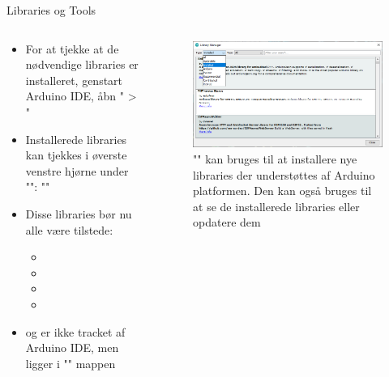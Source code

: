 \documentclass[aspectratio=169]{beamer}
\begin{document}
\begin{frame}{Libraries og Tools}
\begin{columns}
	\begin{column}{0.5\textwidth}
		\begin{textBox}
			\begin{itemize}
				\item For at tjekke at de nødvendige libraries er installeret, genstart Arduino IDE, åbn " > "
				\item Installerede libraries kan tjekkes i øverste venstre hjørne under "": ""
				\item Disse libraries bør nu alle være tilstede:
				\begin{itemize}
					\item {}
					\item {}
					\item {}
					\item {}
				\end{itemize}
				\item {} og  er ikke tracket af Arduino IDE, men ligger i "" mappen
			\end{itemize}
		\end{textBox}
	\end{column}
	\begin{column}{0.5\textwidth}
		\begin{figure}
  			\includegraphics[width=\textwidth]{assets/pictures/librarymanager-installed.png}
  			\caption{"" kan bruges til at installere nye libraries der understøttes af Arduino platformen. Den kan også bruges til at se de installerede libraries eller opdatere dem}
  			\label{fig:librarymanager-installed}
  		\end{figure}
	\end{column}
\end{columns}
\end{frame}
\end{document}
